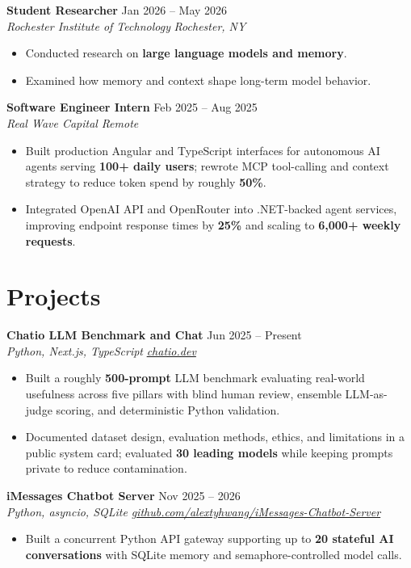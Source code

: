 \documentclass[10pt,letterpaper]{article}
\newif\ifresumeFirstRole
\newcommand{\resumeRole}[4]{%
  \ifresumeFirstRole
    \global\resumeFirstRolefalse
  \else
    \vspace{0pt plus 1fill}%
  \fi
  \textbf{#1} \hfill #2\\
  \textit{#3} \hfill \textit{#4}
}
\begin{document}
\resumeRole{Student Researcher}{Jan 2026 -- May 2026}{Rochester Institute of Technology}{Rochester, NY}
\begin{itemize}
  \item Conducted research on \textbf{large language models and memory}.
  \item Examined how memory and context shape long-term model behavior.
\end{itemize}

\resumeRole{Software Engineer Intern}{Feb 2025 -- Aug 2025}{Real Wave Capital}{Remote}
\begin{itemize}
  \item Built production Angular and TypeScript interfaces for autonomous AI agents serving \textbf{100+ daily users}; rewrote MCP tool-calling and context strategy to reduce token spend by roughly \textbf{50\%}.
  \item Integrated OpenAI API and OpenRouter into .NET-backed agent services, improving endpoint response times by \textbf{25\%} and scaling to \textbf{6,000+ weekly requests}.
\end{itemize}

\section*{Projects}
\resumeRole{Chatio LLM Benchmark and Chat}{Jun 2025 -- Present}{Python, Next.js, TypeScript}{\href{https://chatio.dev}{chatio.dev}}
\begin{itemize}
  \item Built a roughly \textbf{500-prompt} LLM benchmark evaluating real-world usefulness across five pillars with blind human review, ensemble LLM-as-judge scoring, and deterministic Python validation.
  \item Documented dataset design, evaluation methods, ethics, and limitations in a public system card; evaluated \textbf{30 leading models} while keeping prompts private to reduce contamination.
\end{itemize}

\resumeRole{iMessages Chatbot Server}{Nov 2025 -- 2026}{Python, asyncio, SQLite}{\href{https://github.com/alextyhwang/iMessages-Chatbot-Server}{github.com/alextyhwang/iMessages-Chatbot-Server}}
\begin{itemize}
  \item Built a concurrent Python API gateway supporting up to \textbf{20 stateful AI conversations} with SQLite memory and semaphore-controlled model calls.
\end{itemize}
\end{document}
